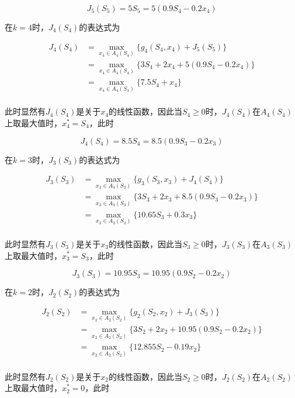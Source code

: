 \documentclass[UTF8]{ctexart}
\begin{document}
$$J_5(S_5)=5S_5=5(0.9S_4-0.2x_4)$$

在$k=4$时，$J_4(S_4)$的表达式为

\begin{equation*}
    \begin{aligned}
        J_4(S_4)&=\max_{x_4\in A_4(S_4)}\{g_4(S_4,x_4)+J_5(S_5)\}\\
                &=\max_{x_4\in A_4(S_4)}\{3S_4+2x_4+5(0.9S_4-0.2x_4)\}\\
                &=\max_{x_4\in A_4(S_4)}\{7.5S_4+x_4\}\\
    \end{aligned}
\end{equation*}

此时显然有$J_4(S_4)$是关于$x_4$的线性函数，因此当$S_4\geq 0$时，$J_4(S_4)$在$A_4(S_4)$上取最大值时，$x_4^*=S_4$，此时

$$J_4(S_4)=8.5S_4=8.5(0.9S_3-0.2x_3)$$

在$k=3$时，$J_3(S_3)$的表达式为

\begin{equation*}
    \begin{aligned}
        J_3(S_3)&=\max_{x_3\in A_3(S_3)}\{g_3(S_3,x_3)+J_4(S_4)\}\\
                &=\max_{x_3\in A_3(S_3)}\{3S_3+2x_3+8.5(0.9S_3-0.2x_3)\}\\
                &=\max_{x_3\in A_3(S_3)}\{10.65S_3+0.3x_3\}\\
    \end{aligned}
\end{equation*}

此时显然有$J_3(S_3)$是关于$x_3$的线性函数，因此当$S_3\geq 0$时，$J_3(S_3)$在$A_3(S_3)$上取最大值时，$x_3^*=S_3$，此时

$$J_3(S_3)=10.95S_3=10.95(0.9S_2-0.2x_2)$$

在$k=2$时，$J_2(S_2)$的表达式为

\begin{equation*}
    \begin{aligned}
        J_2(S_2)&=\max_{x_2\in A_2(S_2)}\{g_2(S_2,x_2)+J_3(S_3)\}\\
                &=\max_{x_2\in A_2(S_2)}\{3S_2+2x_2+10.95(0.9S_2-0.2x_2)\}\\
                &=\max_{x_2\in A_2(S_2)}\{12.855S_2-0.19x_2\}\\
    \end{aligned}
\end{equation*}

此时显然有$J_2(S_2)$是关于$x_2$的线性函数，因此当$S_2\geq 0$时，$J_2(S_2)$在$A_2(S_2)$上取最大值时，$x_2^*=0$，此时
\end{document}
